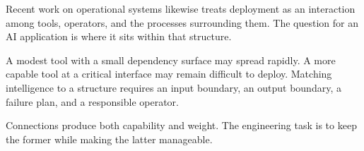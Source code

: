 Recent work on operational systems likewise treats deployment as an interaction among tools, operators, and the processes surrounding them.\cite{dong2022operational} The question for an AI application is where it sits within that structure.

A modest tool with a small dependency surface may spread rapidly. A more capable tool at a critical interface may remain difficult to deploy. Matching intelligence to a structure requires an input boundary, an output boundary, a failure plan, and a responsible operator.

Connections produce both capability and weight. The engineering task is to keep the former while making the latter manageable.
